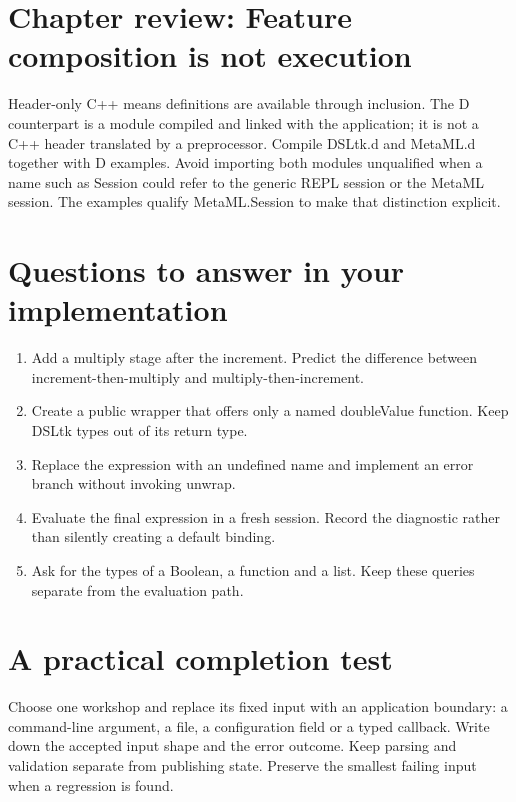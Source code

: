 \clearpage
\section*{Chapter review: Feature composition is not execution}
Header-only C++ means definitions are available through inclusion. The D counterpart is a module compiled and linked with the application; it is not a C++ header translated by a preprocessor. Compile DSLtk.d and MetaML.d together with D examples. Avoid importing both modules unqualified when a name such as Session could refer to the generic REPL session or the MetaML session. The examples qualify MetaML.Session to make that distinction explicit.

\section*{Questions to answer in your implementation}
\begin{enumerate}
\item Add a multiply stage after the increment. Predict the difference between increment-then-multiply and multiply-then-increment.
\item Create a public wrapper that offers only a named doubleValue function. Keep DSLtk types out of its return type.
\item Replace the expression with an undefined name and implement an error branch without invoking unwrap.
\item Evaluate the final expression in a fresh session. Record the diagnostic rather than silently creating a default binding.
\item Ask for the types of a Boolean, a function and a list. Keep these queries separate from the evaluation path.
\end{enumerate}
\section*{A practical completion test}
Choose one workshop and replace its fixed input with an application boundary: a command-line argument, a file, a configuration field or a typed callback. Write down the accepted input shape and the error outcome. Keep parsing and validation separate from publishing state. Preserve the smallest failing input when a regression is found.

